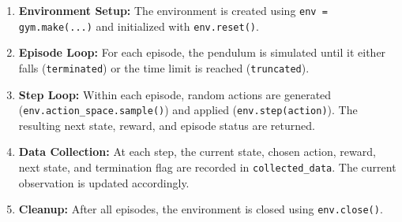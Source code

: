 \documentclass[12pt]{article}
\begin{document}
\begin{enumerate}
    \item \textbf{Environment Setup:} 
    The environment is created using \texttt{env = gym.make(...)} and initialized with \texttt{env.reset()}.

    \item \textbf{Episode Loop:} 
    For each episode, the pendulum is simulated until it either falls (\texttt{terminated}) or the time limit is reached (\texttt{truncated}).

    \item \textbf{Step Loop:} 
    Within each episode, random actions are generated (\texttt{env.action\_space.sample()}) and applied (\texttt{env.step(action)}). The resulting next state, reward, and episode status are returned.

    \item \textbf{Data Collection:} 
    At each step, the current state, chosen action, reward, next state, and termination flag are recorded in \texttt{collected\_data}. The current observation is updated accordingly.

    \item \textbf{Cleanup:} 
    After all episodes, the environment is closed using \texttt{env.close()}.
\end{enumerate}








\end{document}
